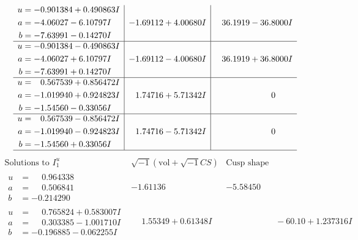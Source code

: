 \documentclass[1p]{elsarticle_modified}
\theoremstyle{definition}
\newcommand{\I}{\sqrt{-1}}
\begin{document}
$$\begin{array}{c|c|c}
\begin{aligned}
u &= -0.901384 + 0.490863 I \\
a &= -4.06027 - 6.10797 I \\
b &= -7.63991 - 0.14270 I\end{aligned}
 & -1.69112 + 4.00680 I & \phantom{-}36.1919 - 36.8000 I \\ \hline\begin{aligned}
u &= -0.901384 - 0.490863 I \\
a &= -4.06027 + 6.10797 I \\
b &= -7.63991 + 0.14270 I\end{aligned}
 & -1.69112 - 4.00680 I & \phantom{-}36.1919 + 36.8000 I \\ \hline\begin{aligned}
u &= \phantom{-}0.567539 + 0.856472 I \\
a &= -1.019940 + 0.924823 I \\
b &= -1.54560 - 0.33056 I\end{aligned}
 & \phantom{-}1.74716 + 5.71342 I & \phantom{-0.000000 } 0 \\ \hline\begin{aligned}
u &= \phantom{-}0.567539 - 0.856472 I \\
a &= -1.019940 - 0.924823 I \\
b &= -1.54560 + 0.33056 I\end{aligned}
 & \phantom{-}1.74716 - 5.71342 I & \phantom{-0.000000 } 0\\
 \hline 
 \end{array}$$\newpage$$\begin{array}{c|c|c}  
\text{Solutions to }I^u_{1}& \I (\text{vol} + \sqrt{-1}CS) & \text{Cusp shape}\\
 \hline 
\begin{aligned}
u &= \phantom{-}0.964338\phantom{ +0.000000I} \\
a &= \phantom{-}0.506841\phantom{ +0.000000I} \\
b &= -0.214290\phantom{ +0.000000I}\end{aligned}
 & -1.61136\phantom{ +0.000000I} & -5.58450\phantom{ +0.000000I} \\ \hline\begin{aligned}
u &= \phantom{-}0.765824 + 0.583007 I \\
a &= \phantom{-}0.303385 - 1.001710 I \\
b &= -0.196885 - 0.062255 I\end{aligned}
 & \phantom{-}1.55349 + 0.61348 I & \phantom{-0.000000 -}     -6
0. 10   + 1.237316 I \\ \hline\begin{aligned}

\end{aligned}
\end{array}$$
\end{document}
